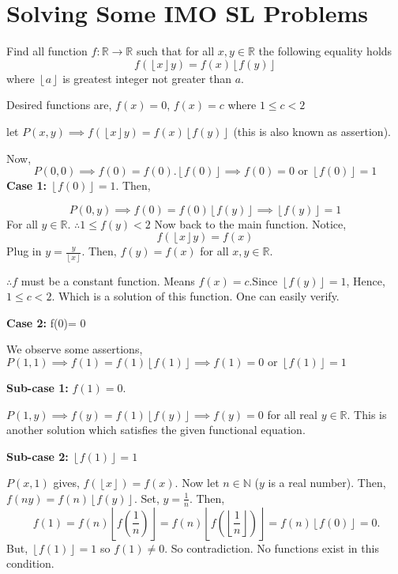 \section{Solving Some IMO SL Problems}

 
 \begin{example}[IMO SL-2010/A1]
 Find all function $f:\mathbb{R}\rightarrow\mathbb{R}$ such that for all $x,y\in\mathbb{R}$ the following equality holds
 \[ f(\left\lfloor x\right\rfloor y)=f(x)\left\lfloor f(y)\right\rfloor \]
 where $\left\lfloor a\right\rfloor $ is greatest integer not greater than $a$.
 
 \end{example}
\begin{soln}
Desired functions are, $f(x) = 0$, $f(x) = c$ where $1\le c < 2 $

let $P(x,y) \implies f(\left\lfloor x\right\rfloor y)=f(x)\left\lfloor f(y)\right\rfloor $
(this is also known as assertion). 

Now, \[P(0,0) \implies f(0) = f(0).\left \lfloor f(0) \right \rfloor \implies f(0) = 0 \text{ or }  \left\lfloor f(0) \right \rfloor = 1\]
\textbf{Case 1:} $\left\lfloor f(0) \right \rfloor = 1 $. Then,


\[P(0,y) \implies f(0) = f(0)\left\lfloor f(y)\right\rfloor \implies \left\lfloor f(y)\right\rfloor = 1 \]
For all $y\in \mathbb R $.
$\therefore 1 \le  f(y) < 2   $
Now back to the main function.
Notice, 
\[f(\left\lfloor x\right\rfloor y) = f(x)  \]
Plug in $y= \frac{y}{\left\lfloor x\right\rfloor} $. Then,
$f(y)=f(x)$ for all $x,y \in \mathbb R$.

$\therefore f$ must be a constant function. Means $f(x) = c $.Since $\left\lfloor f(y)\right\rfloor = 1$,  Hence, $1 \le  c < 2  $. Which is a solution of this function. One can easily verify.

\textbf{Case 2: } f(0)= 0

We observe some assertions, 
$P(1,1) \implies f(1) = f(1)\left\lfloor f(1) \right \rfloor \implies f(1) = 0 \text { or } \left\lfloor f(1) \right \rfloor= 1 $


\textbf{Sub-case 1: }  $f(1) = 0$.

$ P(1,y) \implies f(y) = f(1) \left \lfloor f(y) \right \rfloor  \implies f(y) = 0$ for all real $y \in \mathbb R$.
This is another solution which satisfies the given functional equation.


\textbf{Sub-case 2: } $\left\lfloor f(1) \right \rfloor= 1 $


 $P(x,1)$ gives, $f(\left\lfloor x\right\rfloor) = f(x)$. 
 Now let $n \in \mathbb N$ ($y $ is a real number). Then, $f(ny) = f(n) \left\lfloor f(y) \right\rfloor $. Set, $y = \frac{1}{n}  $. Then,
 \[\ f(1) = f(n) \left\lfloor f\left (\frac{1}{n} \right) \right\rfloor =f(n) \left\lfloor f\left (\left\lfloor \frac{1}{n} \right\rfloor \right  ) \right\rfloor = f(n)\left\lfloor f(0) \right\rfloor  = 0.  \]
But, $\left\lfloor f(1) \right \rfloor= 1 $ so $f(1) \ne 0$. So contradiction.
No functions exist in this condition.
\end{soln}



